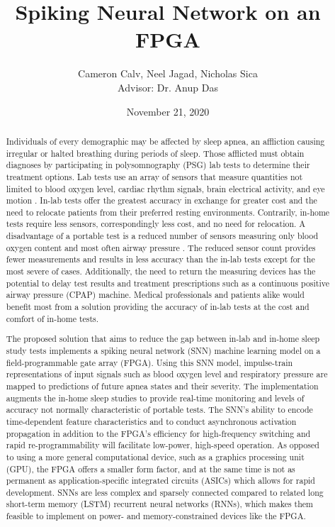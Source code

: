 \documentclass[12pt,titlepage]{article}
\title{Spiking Neural Network on an FPGA}
\author{Cameron Calv, Neel Jagad, Nicholas Sica\\{\small{Advisor: Dr. Anup Das}}}
\date{November 21, 2020}
\begin{document}
\maketitle
\newpage
\clearpage
{}

\begin{abstract}
Individuals of every demographic may be affected by sleep apnea, an affliction causing irregular or halted breathing during periods of sleep. 
Those afflicted must obtain diagnoses by participating in polysomnography (PSG) lab tests to determine their treatment options. 
Lab tests use an array of sensors that measure quantities not limited to blood oxygen level, cardiac rhythm signals, brain electrical activity,
and eye motion \cite{elsevier}. In-lab tests offer the greatest accuracy in exchange for greater cost and the need to relocate patients from
their preferred resting environments.
Contrarily, in-home tests require less sensors, correspondingly less cost, and no need for relocation.
A disadvantage of a portable test is a reduced number of sensors measuring only blood oxygen content and most often airway pressure \cite{elsevier}.
The reduced sensor count provides fewer measurements and results in less accuracy than the in-lab tests except for the most severe of cases.
Additionally, the need to return the measuring devices has the potential to delay test results and treatment prescriptions such as a continuous
positive airway pressure (CPAP) machine.
Medical professionals and patients alike would benefit most from a solution providing the accuracy of in-lab tests at the cost and comfort of
in-home tests. 

The proposed solution that aims to reduce the gap between in-lab and in-home sleep study tests implements a spiking neural network (SNN)
machine learning model on a field-programmable gate array (FPGA). Using this SNN model, impulse-train representations of input signals
such as blood oxygen level and respiratory pressure are mapped to predictions of future apnea states and their severity.
The implementation augments the in-home sleep studies to provide real-time monitoring and levels of accuracy not normally characteristic of
portable tests. The SNN’s ability to encode time-dependent feature characteristics and to conduct asynchronous activation propagation
in addition to the FPGA’s efficiency for high-frequency switching and rapid re-programmability will facilitate low-power, high-speed operation.
As opposed to using a more general computational device, such as a graphics processing unit (GPU), the FPGA offers a smaller form factor, and
at the same time is not as permanent as application-specific integrated circuits (ASICs) which allows for rapid development. SNNs are less complex
and sparsely connected compared to related long short-term memory (LSTM) recurrent neural networks (RNNs), which makes them feasible to implement
on power- and memory-constrained devices like the FPGA. 


\end{abstract}
\end{document}

